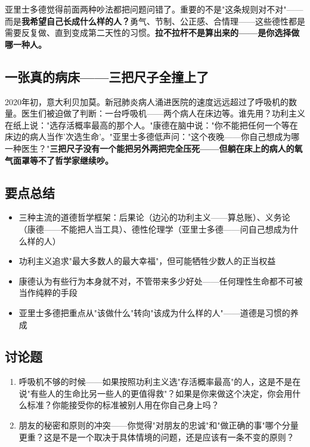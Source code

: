 \documentclass[a4paper,12pt]{ctexart}
\begin{document}
亚里士多德觉得前面两种吵法都把问题问错了。重要的不是"这条规则对不对"——而是\textbf{我希望自己长成什么样的人？}\:勇气、节制、公正感、合情理——这些德性都是需要反复做、直到变成第二天性的习惯。\textbf{拉不拉杆不是算出来的——是你选择做哪一种人。}

\subsection*{一张真的病床——三把尺子全撞上了}

2020年初，意大利贝加莫。新冠肺炎病人涌进医院的速度远远超过了呼吸机的数量。医生们被迫做了判断：一台呼吸机——两个病人在床边等。谁先用？功利主义在纸上说："选存活概率最高的那个人。"康德在脑中说："你不能把任何一个等在床边的病人当作'次选生命'。"亚里士多德低声问："这个夜晚——你自己想成为哪一种医生？"\textbf{三把尺子没有一个能把另外两把完全压死——但躺在床上的病人的氧气面罩等不了哲学家继续吵。}


\subsection*{要点总结}
\begin{itemize}
  \item 三种主流的道德哲学框架：后果论（边沁的功利主义——算总账）、义务论（康德——不能把人当工具）、德性伦理学（亚里士多德——问自己想成为什么样的人）
  \item 功利主义追求"最大多数人的最大幸福"，但可能牺牲少数人的正当权益
  \item 康德认为有些行为本身就不对，不管带来多少好处——任何理性生命都不可被当作纯粹的手段
  \item 亚里士多德把重点从"该做什么"转向"该成为什么样的人"——道德是习惯的养成
\end{itemize}

\subsection*{讨论题}
\begin{enumerate}
  \item 呼吸机不够的时候——如果按照功利主义选"存活概率最高"的人，这是不是在说"有些人的生命比另一些人的更值得救"？如果是你来做这个决定，你会用什么标准？你能接受你的标准被别人用在你自己身上吗？
  \item 朋友的秘密和原则的冲突——你觉得"对朋友的忠诚"和"做正确的事"哪个分量更重？这是不是一个取决于具体情境的问题，还是应该有一条不变的原则？
\end{enumerate}
\end{document}
